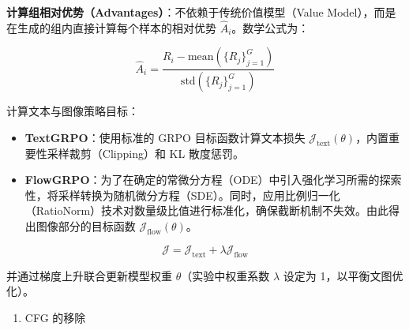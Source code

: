 \textbf{计算组相对优势（Advantages）}：不依赖于传统价值模型（Value Model），而是在生成的组内直接计算每个样本的相对优势 \(\hat A_i\)。数学公式为：

\[
\hat A_i=
\frac{R_i-\mathrm{mean}(\{R_j\}_{j=1}^{G})}
{\mathrm{std}(\{R_j\}_{j=1}^{G})}
\]

计算文本与图像策略目标：

\begin{itemize}
\tightlist
\item
  \textbf{TextGRPO}：使用标准的 GRPO 目标函数计算文本损失 \(\mathcal{J}_{\mathrm{text}}(\theta)\)，内置重要性采样裁剪（Clipping）和 KL 散度惩罚。
\item
  \textbf{FlowGRPO}：为了在确定的常微分方程（ODE）中引入强化学习所需的探索性，将采样转换为随机微分方程（SDE）。同时，应用比例归一化（RatioNorm）技术对数量级比值进行标准化，确保截断机制不失效。由此得出图像部分的目标函数 \(\mathcal{J}_{\mathrm{flow}}(\theta)\)。
\end{itemize}

\[
\mathcal{J}
=\mathcal{J}_{\mathrm{text}}+\lambda\mathcal{J}_{\mathrm{flow}}
\]

并通过梯度上升联合更新模型权重 \(\theta\)（实验中权重系数 \(\lambda\) 设定为 1，以平衡文图优化）。

\begin{enumerate}
\def\labelenumi{\arabic{enumi}.}
\setcounter{enumi}{2}
\tightlist
\item
  CFG 的移除
\end{enumerate}

